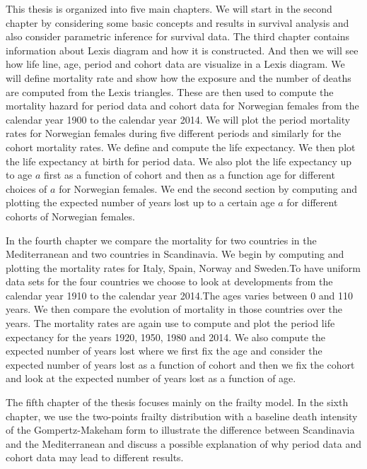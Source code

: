 This thesis is organized into five main chapters. We will start in the second chapter by considering some basic concepts and results in survival analysis and also consider parametric inference for survival data.
The third chapter contains information about Lexis diagram and how it is constructed. And then we will see how life line, age, period and cohort data are visualize in a Lexis diagram. We will define mortality rate and show how the exposure and the number of deaths are computed from the Lexis triangles. These are then used to compute the mortality hazard for period data and cohort data for Norwegian females from the calendar year 1900 to the calendar year 2014. We will plot the period mortality rates for Norwegian females during five different periods and similarly for the cohort mortality rates. We define and compute the life expectancy. We then plot the life expectancy at birth for period data. We also plot the life expectancy up to age $a$ first as a function of cohort and then as a function age for different choices of $a$ for Norwegian females. We end the second section by computing and plotting the expected number of years lost up to a certain age $a$ for different cohorts of Norwegian females.

In the fourth chapter we compare the mortality for two countries in the Mediterranean and two countries in Scandinavia. We begin by computing and plotting the mortality rates for Italy, Spain, Norway and Sweden.To have uniform data sets for the four countries we choose to look at developments from the calendar year 1910 to the calendar year 2014.The ages varies between 0 and 110 years. We then compare the evolution of mortality in those countries over the years. The mortality rates are again use to compute and plot the period life expectancy for the years 1920, 1950, 1980 and 2014. We also compute the expected number of years lost where we first fix the age and consider the expected number of years lost as a function of cohort and then we fix the cohort and look at the expected number of years lost as a function of age.

The fifth  chapter of the thesis focuses mainly on the frailty model. In the sixth chapter, we use the two-points frailty distribution with a baseline death intensity of the Gompertz-Makeham form to illustrate the difference between Scandinavia and the Mediterranean and discuss a possible explanation of why period data and cohort data may lead to different results.


